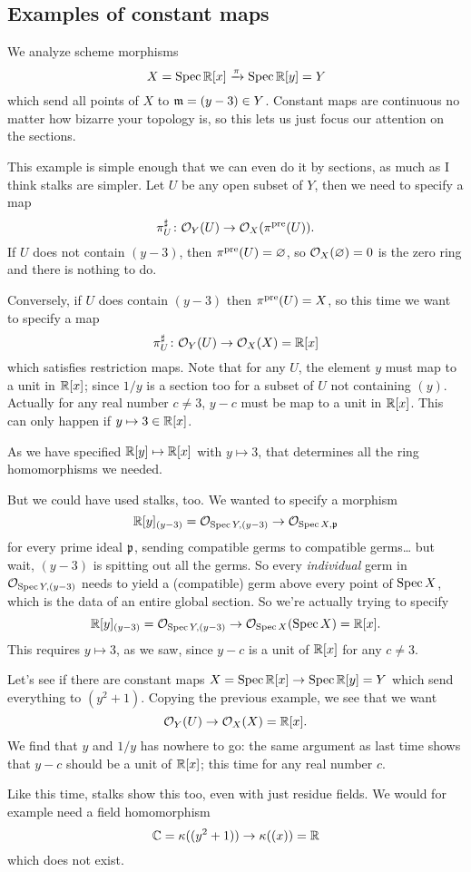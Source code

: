 \subsection{Examples of constant maps}
\begin{example}
	We analyze scheme morphisms
	\[ X = \operatorname{Spec} \mathbb R[x] \xrightarrow{\pi} \operatorname{Spec} \mathbb R[y] = Y \]
	which send all points of $X$ to $\mathfrak m = (y-3) \in Y$.
	Constant maps are continuous no matter how bizarre your topology is,
	so this lets us just focus our attention on the sections.

	This example is simple enough that we can even do it by sections,
	as much as I think stalks are simpler.
	Let $U$ be any open subset of $Y$, then we need to specify a map
	\[ \pi^\sharp_U \colon \mathcal O_Y(U) \to \mathcal O_X(\pi^{\text{pre}}(U)). \]
	If $U$ does not contain $(y-3)$, then $\pi^{\text{pre}}(U) = \varnothing$,
	so $\mathcal O_X(\varnothing) = 0$ is the zero ring and there is nothing to do.

	Conversely, if $U$ does contain $(y-3)$ then $\pi^{\text{pre}}(U) = X$,
	so this time we want to specify a map
	\[ \pi^\sharp_U \colon \mathcal O_Y(U) \to \mathcal O_X(X) = \mathbb R[x] \]
	which satisfies restriction maps.
	Note that for any $U$, the element $y$ must map to a unit in $\mathbb R[x]$;
	since $1/y$ is a section too for a subset of $U$ not containing $(y)$.
	Actually for any real number $c \neq 3$,
	$y-c$ must be map to a unit in $\mathbb R[x]$.
	This can only happen if $y \mapsto 3 \in \mathbb R[x]$.

	As we have specified $\mathbb R[y] \mapsto \mathbb R[x]$ with $y \mapsto 3$,
	that determines all the ring homomorphisms we needed.
\end{example}
But we could have used stalks, too.
We wanted to specify a morphism
\[ \mathbb R[y]_{(y-3)} = \mathcal O_{\operatorname{Spec} Y, (y-3)} \to \mathcal O_{\operatorname{Spec} X, \mathfrak p} \]
for every prime ideal $\mathfrak p$,
sending compatible germs to compatible germs\dots
but wait, $(y-3)$ is spitting out all the germs.
So every \emph{individual} germ in $\mathcal O_{\operatorname{Spec} Y, (y-3)}$
needs to yield a (compatible) germ above every point of $\operatorname{Spec} X$,
which is the data of an entire global section.
So we're actually trying to specify
\[ \mathbb R[y]_{(y-3)} = \mathcal O_{\operatorname{Spec} Y, (y-3)} \to \mathcal O_{\operatorname{Spec} X}(\operatorname{Spec} X) = \mathbb R[x]. \]
This requires $y \mapsto 3$, as we saw,
since $y-c$ is a unit of $\mathbb R[x]$ for any $c \neq 3$.

\begin{example}
	Let's see if there are constant maps
	$X = \operatorname{Spec} \mathbb R[x] \to \operatorname{Spec} \mathbb R[y] = Y$
	which send everything to $(y^2+1)$.
	Copying the previous example, we see that we want
	\[ \mathcal O_Y(U) \to \mathcal O_X(X) = \mathbb R[x]. \]
	We find that $y$ and $1/y$ has nowhere to go:
	the same argument as last time shows that $y-c$ should be a unit of $\mathbb R[x]$;
	this time for any real number $c$.

	Like this time, stalks show this too,
	even with just residue fields.
	We would for example need a field homomorphism
	\[ \mathbb C = \kappa( (y^2+1) ) \to \kappa( (x) ) = \mathbb R \]
	which does not exist.
\end{example}

